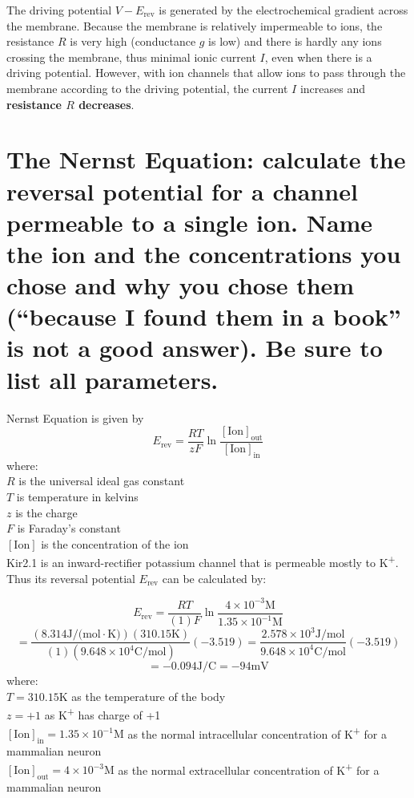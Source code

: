 \documentclass{article}
\begin{document}
The driving potential $V-E_{\text{rev}}$ is generated by the electrochemical gradient across the membrane.
Because the membrane is relatively impermeable to ions, the resistance $R$ is very high (conductance $g$ is low) and there is hardly any ions crossing the membrane, thus minimal ionic current $I$, even when there is a driving potential.
However, with ion channels that allow ions to pass through the membrane according to the driving potential, the current $I$ increases and \textbf{resistance $R$ decreases}.


\section{ The Nernst Equation: calculate the reversal potential for a channel permeable to a single ion. Name the ion and the concentrations you chose and why you chose them (``because I found them in a book'' is not a good answer). Be sure to list all parameters.}
Nernst Equation is given by
$$E_{\text{rev}} = \frac{RT}{zF}\ln\frac{[\text{Ion}]_{\text{out}}}{[\text{Ion}]_{\text{in}}}$$
where: \\
$R$ is the universal ideal gas constant \\
$T$ is temperature in kelvins \\
$z$ is the charge \\
$F$ is Faraday's constant \\
$[\text{Ion}]$ is the concentration of the ion
\\

Kir2.1 is an inward-rectifier potassium channel that is permeable mostly to K\textsuperscript{+}. Thus its reversal potential $E_\text{rev}$ can be calculated by:

$$E_{\text{rev}} = \frac{RT}{(1)F}\ln\frac{4\times10^{-3}\text{M}}{1.35\times10^{-1}\text{M}}$$
$$= \frac{(8.314\text{J/(mol}\cdot\text{K)})(310.15\text{K})}{(1)(9.648\times10^4\text{C/mol})}(-3.519) = \frac{2.578\times10^{3}\text{J/mol}}{9.648\times10^4\text{C/mol}}(-3.519)$$
$$= -0.094\text{J/C} = \boxed{-94\text{mV}}$$
where: \\
$T = 310.15\text{K}$ as the temperature of the body \\
$z = +1$ as K\textsuperscript{+} has charge of +1 \\
$[\text{Ion}]_{\text{in}} = 1.35\times10^{-1}\text{M}$ as the normal intracellular concentration of K\textsuperscript{+} for a mammalian neuron \\
$[\text{Ion}]_{\text{out}} = 4\times10^{-3}\text{M}$ as the normal extracellular concentration of K\textsuperscript{+} for a mammalian neuron
\\
\end{document}
